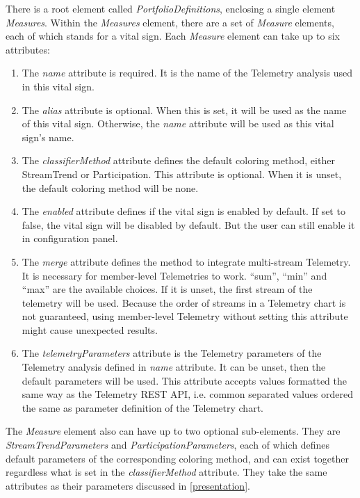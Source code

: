 There is a root element called {\it PortfolioDefinitions}, enclosing a single element {\it Measures}. Within the {\it Measures} element, there are a set of {\it Measure} elements, each of which stands for a vital sign. Each {\it Measure} element can take up to six attributes:
\begin{enumerate}
\item The {\it name} attribute is required. It is the name of the Telemetry analysis used in this vital sign.
\item The {\it alias} attribute is optional. When this is set, it will be used as the name of this vital sign. Otherwise, the {\it name} attribute will be used as this vital sign's name.
\item The {\it classifierMethod} attribute defines the default coloring method, either StreamTrend or Participation. This attribute is optional. When it is unset, the default coloring method will be none.
\item The {\it enabled} attribute defines if the vital sign is enabled by default. If set to false, the vital sign will be disabled by default. But the user can still enable it in configuration panel.
\item The {\it merge} attribute defines the method to integrate multi-stream Telemetry. It is necessary for member-level Telemetries to work. ``sum'', ``min'' and ``max'' are the available choices. If it is unset, the first stream of the telemetry will be used. Because the order of streams in a Telemetry chart is not guaranteed, using member-level Telemetry without setting this attribute might cause unexpected results.
\item The {\it telemetryParameters} attribute is the Telemetry parameters of the Telemetry analysis defined in {\it name} attribute. It can be unset, then the default parameters will be used. This attribute accepts values formatted the same way as the Telemetry REST API, i.e. common separated values ordered the same as parameter definition of the Telemetry chart.
\end{enumerate}

The {\it Measure} element also can have up to two optional sub-elements. They are {\it StreamTrendParameters} and {\it ParticipationParameters}, each of which defines default parameters of the corresponding coloring method, and can exist together regardless what is set in the {\it classifierMethod} attribute. They take the same attributes as their parameters discussed in \autoref{presentation}.


